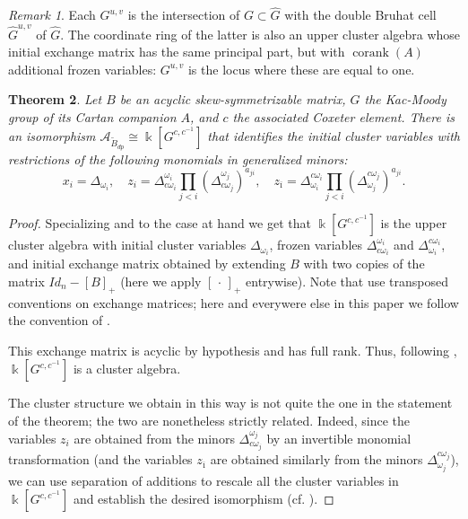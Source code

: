 \documentclass[12pt]{amsart}
\newcommand{\cA}{\mathcal{A}}
\newcommand{\kk}{\Bbbk}
\DeclareMathOperator{\corank}{corank}
\newcommand{\ol}[1]{\overline{#1}}
\newcommand{\Bdp}{\widetilde{B}_{dp}}
\newcommand{\cvar}{z}
\newtheorem{theorem}{Theorem}[section]
\theoremstyle{remark}
\newtheorem{remark}[theorem]{Remark}
\numberwithin{equation}{section}
\numberwithin{figure}{section}
\begin{document}
\begin{remark}
  Each $G^{u,v}$ is the intersection of $G \subset \widehat{G}$ with the double Bruhat cell $\widehat{G}^{u,v}$ of $\widehat{G}$.
  The coordinate ring of the latter is also an upper cluster algebra whose initial exchange matrix has the same principal part, but with $\corank(A)$ additional frozen variables: $G^{u,v}$ is the locus where these are equal to one.
\end{remark}

\begin{theorem}
  \label{thm:coordring}
  Let $B$ be an acyclic skew-symmetrizable matrix, $G$ the Kac-Moody group of its Cartan companion $A$, and $c$ the associated Coxeter element.
  There is an isomorphism $\cA_{\Bdp} \cong \kk[G^{c,c^{-1}}]$ that identifies the initial cluster variables with restrictions of the following monomials in generalized minors:
  \begin{equation}
    \label{eq:initialcluster}
    x_i = \Delta_{\omega_i},
    \quad 
    \cvar_i = \Delta^{\omega_i}_{ c\omega_i} \prod_{j < i}(\Delta^{\omega_j}_{c \omega_j})^{a_{ji}},
    \quad 
    \cvar_{\ol{\imath}} = \Delta^{c \omega_i}_{\omega_i} \prod_{j < i}(\Delta^{c \omega_j}_{\omega_j})^{a_{ji}}.
  \end{equation}
\end{theorem}
\begin{proof}
  Specializing \cite[Theorem 2.10]{BFZ05} and \cite[Theorem 4.9]{Wil13} to the case at hand we get that $\kk[G^{c,c^{-1}}]$ is the upper cluster algebra with initial cluster variables $\Delta_{\omega_i}$, frozen variables $\Delta_{c\omega_i}^{\omega_i}$ and $\Delta_{\omega_i}^{c\omega_i}$, and initial exchange matrix obtained by extending $B$ with two copies of the matrix $Id_n-[B]_+$ (here we apply $[\,\cdot\,]_+$ entrywise).
  Note that \cite{BFZ05,Wil13} use transposed conventions on exchange matrices; here and everywere else in this paper we follow the convention of \cite{BFZ05}.

  This exchange matrix is acyclic by hypothesis and has full rank.
  Thus, following \cite[Corollary 1.19]{BFZ05}, $\kk[G^{c,c^{-1}}]$ is a cluster algebra.

  The cluster structure we obtain in this way is not quite the one in the statement of the theorem; the two are nonetheless strictly related.
  Indeed, since the variables $\cvar_i$ are obtained from the minors $\Delta^{\omega_j}_{ c\omega_j}$ by an invertible monomial transformation (and the variables $\cvar_{\ol{\imath}}$ are obtained similarly from the minors $\Delta^{c \omega_j}_{\omega_j}$), we can use separation of additions to rescale all the cluster variables in $\kk[G^{c,c^{-1}}]$ and establish the desired isomorphism (cf. \cite[Proposition 4.5]{YZ08}).
\end{proof}
\end{document}
